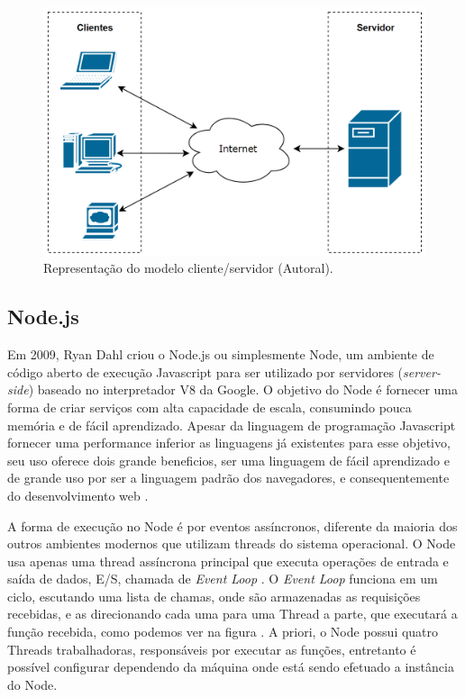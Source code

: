 \begin{figure}[H]
  \centering
  \includegraphics[width=.80\textwidth]{assets/modelo-cliente-servidor.png} 
  \caption{Representação do modelo cliente/servidor (Autoral).}
  \label{fig:modelo-cliente-servidor} 
\end{figure}

\subsection{Node.js}
\label{fund:node}
Em 2009, Ryan Dahl criou o Node.js ou simplesmente Node, um ambiente de código aberto de execução Javascript para ser utilizado por servidores (\textit{server-side}) baseado no interpretador V8 da Google. O objetivo do Node é fornecer uma forma de criar serviços com alta capacidade de escala, consumindo pouca memória e de fácil aprendizado. Apesar da linguagem de programação Javascript fornecer uma performance inferior as linguagens já existentes para esse objetivo, seu uso oferece dois grande beneficios, ser uma linguagem de fácil aprendizado e de grande uso por ser a linguagem padrão dos navegadores, e consequentemente do desenvolvimento web \cite{tilkov2010node}.

A forma de execução no Node é por eventos assíncronos, diferente da maioria dos outros ambientes modernos que utilizam threads do sistema operacional. O Node usa apenas uma thread assíncrona principal que executa operações de entrada e saída de dados, E/S, chamada de \textit{Event Loop} \cite{nodejsAbout}. O \textit{Event Loop} funciona em um ciclo, escutando uma lista de chamas, onde são armazenadas as requisições recebidas, e as direcionando cada uma para uma Thread a parte, que executará a função recebida, como podemos ver na figura . A priori, o  Node possui quatro Threads trabalhadoras, responsáveis por executar as funções, entretanto é possível configurar dependendo da máquina onde está sendo efetuado a instância do Node.

